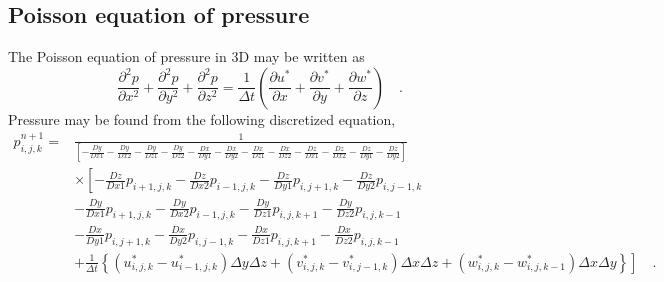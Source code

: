 \documentclass[12pt,a4paper,fleqn]{article}
\begin{document}
\subsection{Poisson equation of pressure}
The Poisson equation of pressure in 3D may be written as
\begin{equation} \label{eq:3D-poisson-components}
\frac{\partial^2 p}{\partial x^2} + \frac{\partial^2 p}{\partial y^2} + \frac{\partial^2 p}{\partial z^2}
= \frac{1}{\Delta t} \left(\frac{\partial u^*}{\partial x} + \frac{\partial v^*}{\partial y} + \frac{\partial w^*}{\partial z}\right) \quad.
\end{equation}
Pressure may be found from the following discretized equation,
\begin{align}
p_{i,j,k}^{n+1} =
&\frac{1}{\left[ - \frac{Dy}{Dx1} - \frac{Dy}{Dx2} - \frac{Dy}{Dz1}- \frac{Dy}{Dz2} - \frac{Dx}{Dy1} - \frac{Dx}{Dy2} - \frac{Dx}{Dz1} - \frac{Dx}{Dz2} - \frac{Dz}{Dx1} - \frac{Dz}{Dx2} - \frac{Dz}{Dy1} - \frac{Dz}{Dy2}\right]}
\nonumber \\
&\times
\left[
- \frac{Dz}{Dx1}p_{i+1,j,k} - \frac{Dz}{Dx2}p_{i-1,j,k} - \frac{Dz}{Dy1}p_{i,j+1,k} - \frac{Dz}{Dy2}p_{i,j-1,k} \right.
\nonumber \\
&- \frac{Dy}{Dx1}p_{i+1,j,k} - \frac{Dy}{Dx2}p_{i-1,j,k} - \frac{Dy}{Dz1}p_{i,j,k+1} - \frac{Dy}{Dz2}p_{i,j,k-1}
\nonumber \\
&- \frac{Dx}{Dy1}p_{i,j+1,k} - \frac{Dx}{Dy2}p_{i,j-1,k} - \frac{Dx}{Dz1}p_{i,j,k+1} - \frac{Dx}{Dz2}p_{i,j,k-1}
\nonumber \\
&\left.
+ \frac{1}{\Delta t}\left\{
\left(u^*_{i,j,k}-u^*_{i-1,j,k}\right) \Delta y \Delta z
+ \left(v^*_{i,j,k}-v^*_{i,j-1,k}\right) \Delta x \Delta z
+ \left(w^*_{i,j,k}-w^*_{i,j,k-1}\right) \Delta x \Delta y
\right\}
\right]
\quad .
\end{align}
\end{document}
